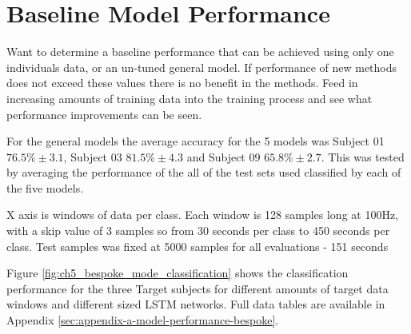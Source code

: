 \section{Baseline Model Performance}
\label{sec:personalisation-baseline-model-results}
Want to determine a baseline performance that can be achieved using only one individuals data, or an un-tuned general model. If performance of new methods does not exceed these values there is no benefit in the methods. Feed in increasing amounts of training data into the training process and see what performance improvements can be seen.

For the general models the average accuracy for the 5 models was Subject 01 $76.5\%\pm3.1$, Subject 03 $81.5\%\pm4.3$ and Subject 09 $65.8\%\pm2.7$. This was tested by averaging the performance of the all of the test sets used classified by each of the five models.

X axis is windows of data per class. Each window is 128 samples long at 100Hz, with a skip value of 3 samples so from 30 seconds per class to 450 seconds per class. Test samples was fixed at 5000 samples for all evaluations - 151 seconds

Figure \ref{fig:ch5_bespoke_mode_classification} shows the classification performance for the three Target subjects for different amounts of target data windows and different sized LSTM networks. Full data tables are available in Appendix \ref{sec:appendix-a-model-performance-bespoke}.

